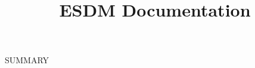 \documentclass{article}
\title{ESDM Documentation}
\date{}
\author{}
\begin{document}
\maketitle

\tableofcontents















SUMMARY 

\end{document}

